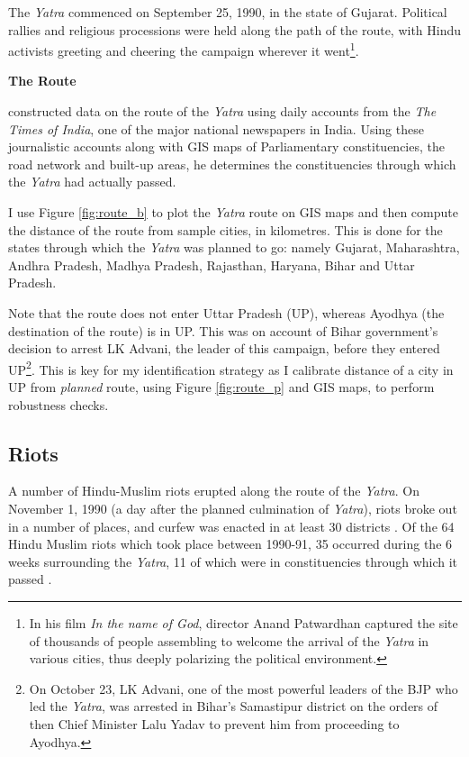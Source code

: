 \documentclass{article}
\begin{document}
The \emph{Yatra} commenced on September 25, 1990, in the state of Gujarat. Political rallies and religious processions were held along the path of the route, with Hindu activists greeting and cheering the campaign wherever it went\footnote{In his film \emph{In the name of God}, director Anand Patwardhan captured the site of thousands of people assembling to welcome the arrival of the \emph{Yatra} in various cities, thus deeply polarizing the political environment.}. 

\textbf{The Route}

\cite{blakeslee.2018} constructed data on the route of the \emph{Yatra} using daily accounts from the \emph{The Times of India}, one of the major national newspapers in India. Using these journalistic accounts along with GIS maps of Parliamentary constituencies, the road network and built-up areas, he determines the constituencies through which the \emph{Yatra} had actually passed.

I use Figure \ref{fig:route_b} to plot the \emph{Yatra} route on GIS maps and then compute the distance of the route from sample cities, in kilometres. This is done for the states through which the \emph{Yatra} was planned to go: namely Gujarat, Maharashtra, Andhra Pradesh, Madhya Pradesh, Rajasthan, Haryana, Bihar and Uttar Pradesh. 

Note that the route does not enter Uttar Pradesh (UP), whereas Ayodhya (the destination of the route) is in UP. This was on account of Bihar government's decision to arrest LK Advani, the leader of this campaign, before they entered UP\footnote{On October 23, LK Advani, one of the most powerful leaders of the BJP who led the \emph{Yatra}, was arrested in Bihar's Samastipur district on the orders of then Chief Minister Lalu Yadav to prevent him from proceeding to Ayodhya.}. This is key for my identification strategy as I calibrate distance of a city in UP from \emph{planned} route, using Figure \ref{fig:route_p} and GIS maps, to perform robustness checks.   

\subsection{Riots}
A number of Hindu-Muslim riots erupted along the route of the \emph{Yatra}. On November 1, 1990 (a day after the planned culmination of \emph{Yatra}), riots broke out in a number of places, and curfew was enacted in at least 30 districts \citep{engineer1991bloody}. Of the 64 Hindu Muslim riots which took place between 1990-91, 35 occurred during the 6 weeks surrounding the \emph{Yatra}, 11 of which were in constituencies through which it passed \citep{blakeslee.2018}. 
\end{document}
